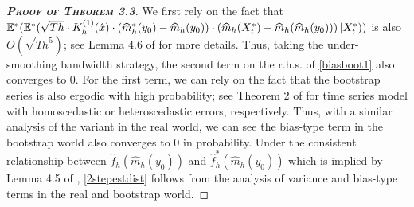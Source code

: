 \documentclass[a4paper]{article}
\begin{document}
\begin{proof}[\textbf{\textsc{Proof of Theorem 3.3}}]
We first rely on the fact that $\mathbb{E}^{*}(\mathbb{E}^{*}(\sqrt{Th}\cdot K^{(1)}_h(\Hat{x})\cdot (\widehat{m}^*_{h}(y_0) - \widehat{m}_h(y_0)) \cdot\left(\widehat{m}_h(X^*_t) -  \widehat{m}_h(\widehat{m}_h(y_0))\right) \vert X^*_t))$ is also $O(\sqrt{Th^5})$; see Lemma 4.6 of \cite{franke2002bootstrap} for more details. Thus, taking the under-smoothing bandwidth strategy, the second term on the r.h.s. of \cref{biasboot1} also converges to 0. For the first term, we can rely on the fact that the bootstrap series is also ergodic with high probability; see Theorem 2 of \cite{franke2002properties,franke2004bootstrapping} for time series model with homoscedastic or heteroscedastic errors, respectively. Thus, with a similar analysis of the variant in the real world, we can see the bias-type term in the bootstrap world also converges to 0 in probability. Under the consistent relationship between $\hat{f}_{h}(\widehat{m}_{h}(y_0))$ and $\hat{f}^*_{h}(\widehat{m}_{h}(y_0))$ which is implied by Lemma 4.5 of \cite{franke2002bootstrap}, \cref{2stepestdist} follows from the analysis of variance and bias-type terms in the real and bootstrap world. 

\end{proof}



\clearpage
\end{document}

